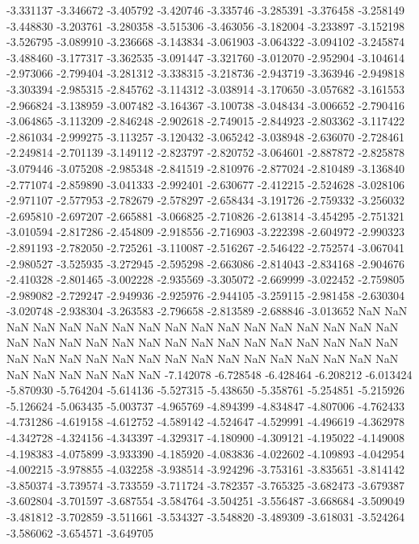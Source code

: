 -3.331137
-3.346672
-3.405792
-3.420746
-3.335746
-3.285391
-3.376458
-3.258149
-3.448830
-3.203761
-3.280358
-3.515306
-3.463056
-3.182004
-3.233897
-3.152198
-3.526795
-3.089910
-3.236668
-3.143834
-3.061903
-3.064322
-3.094102
-3.245874
-3.488460
-3.177317
-3.362535
-3.091447
-3.321760
-3.012070
-2.952904
-3.104614
-2.973066
-2.799404
-3.281312
-3.338315
-3.218736
-2.943719
-3.363946
-2.949818
-3.303394
-2.985315
-2.845762
-3.114312
-3.038914
-3.170650
-3.057682
-3.161553
-2.966824
-3.138959
-3.007482
-3.164367
-3.100738
-3.048434
-3.006652
-2.790416
-3.064865
-3.113209
-2.846248
-2.902618
-2.749015
-2.844923
-2.803362
-3.117422
-2.861034
-2.999275
-3.113257
-3.120432
-3.065242
-3.038948
-2.636070
-2.728461
-2.249814
-2.701139
-3.149112
-2.823797
-2.820752
-3.064601
-2.887872
-2.825878
-3.079446
-3.075208
-2.985348
-2.841519
-2.810976
-2.877024
-2.810489
-3.136840
-2.771074
-2.859890
-3.041333
-2.992401
-2.630677
-2.412215
-2.524628
-3.028106
-2.971107
-2.577953
-2.782679
-2.578297
-2.658434
-3.191726
-2.759332
-3.256032
-2.695810
-2.697207
-2.665881
-3.066825
-2.710826
-2.613814
-3.454295
-2.751321
-3.010594
-2.817286
-2.454809
-2.918556
-2.716903
-3.222398
-2.604972
-2.990323
-2.891193
-2.782050
-2.725261
-3.110087
-2.516267
-2.546422
-2.752574
-3.067041
-2.980527
-3.525935
-3.272945
-2.595298
-2.663086
-2.814043
-2.834168
-2.904676
-2.410328
-2.801465
-3.002228
-2.935569
-3.305072
-2.669999
-3.022452
-2.759805
-2.989082
-2.729247
-2.949936
-2.925976
-2.944105
-3.259115
-2.981458
-2.630304
-3.020748
-2.938304
-3.263583
-2.796658
-2.813589
-2.688846
-3.013652
NaN
NaN
NaN
NaN
NaN
NaN
NaN
NaN
NaN
NaN
NaN
NaN
NaN
NaN
NaN
NaN
NaN
NaN
NaN
NaN
NaN
NaN
NaN
NaN
NaN
NaN
NaN
NaN
NaN
NaN
NaN
NaN
NaN
NaN
NaN
NaN
NaN
NaN
NaN
NaN
NaN
NaN
NaN
NaN
NaN
NaN
NaN
NaN
NaN
NaN
NaN
NaN
NaN
-7.142078
-6.728548
-6.428464
-6.208212
-6.013424
-5.870930
-5.764204
-5.614136
-5.527315
-5.438650
-5.358761
-5.254851
-5.215926
-5.126624
-5.063435
-5.003737
-4.965769
-4.894399
-4.834847
-4.807006
-4.762433
-4.731286
-4.619158
-4.612752
-4.589142
-4.524647
-4.529991
-4.496619
-4.362978
-4.342728
-4.324156
-4.343397
-4.329317
-4.180900
-4.309121
-4.195022
-4.149008
-4.198383
-4.075899
-3.933390
-4.185920
-4.083836
-4.022602
-4.109893
-4.042954
-4.002215
-3.978855
-4.032258
-3.938514
-3.924296
-3.753161
-3.835651
-3.814142
-3.850374
-3.739574
-3.733559
-3.711724
-3.782357
-3.765325
-3.682473
-3.679387
-3.602804
-3.701597
-3.687554
-3.584764
-3.504251
-3.556487
-3.668684
-3.509049
-3.481812
-3.702859
-3.511661
-3.534327
-3.548820
-3.489309
-3.618031
-3.524264
-3.586062
-3.654571
-3.649705

